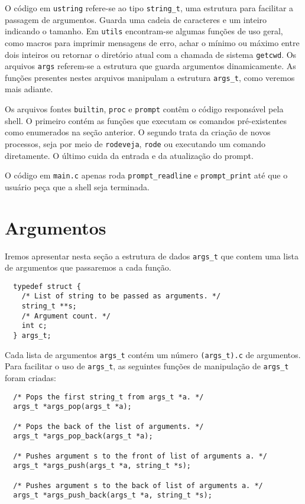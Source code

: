 \documentclass{amsart}
\theoremstyle{plain}
\newcommand{\code}[1]{\lstinline[mathescape=true]{#1}}
\begin{document}
O código em \code{ustring} refere-se ao tipo \code{string_t}, uma estrutura para facilitar a
passagem de argumentos. Guarda uma cadeia de caracteres e um inteiro indicando o tamanho. Em
\code{utils} encontram-se algumas funções de uso geral, como macros para imprimir mensagens de
erro, achar o mínimo ou máximo entre dois inteiros ou retornar o diretório atual com a chamada de
sistema \code{getcwd}. Os arquivos \code{args} referem-se a estrutura que guarda argumentos
dinamicamente. As funções presentes nestes arquivos manipulam a estrutura \code{args_t}, como
veremos mais adiante.

Os arquivos fontes \code{builtin}, \code{proc} e \code{prompt} contêm o código responsável pela
shell. O primeiro contém as funções que executam os comandos pré-existentes como enumerados na
seção anterior. O segundo trata da criação de novos processos, seja por meio de \code{rodeveja},
\code{rode} ou executando um comando diretamente. O último cuida da entrada e da atualização do
prompt.

O código em \code{main.c} apenas roda \code{prompt_readline} e \code{prompt_print} até que o
usuário peça que a shell seja terminada.

\section{Argumentos}

Iremos apresentar nesta seção a estrutura de dados \code{args_t} que contem uma lista de argumentos
que passaremos a cada função.

\begin{verbatim}
  typedef struct {
    /* List of string to be passed as arguments. */
    string_t **s;
    /* Argument count. */
    int c;
  } args_t;
\end{verbatim}

Cada lista de argumentos \code{args_t} contém um número \code{(args_t).c} de argumentos. Para
facilitar o uso de \code{args_t}, as seguintes funções de manipulação de \code{args_t} foram
criadas:

\begin{verbatim}
  /* Pops the first string_t from args_t *a. */
  args_t *args_pop(args_t *a);

  /* Pops the back of the list of arguments. */
  args_t *args_pop_back(args_t *a);

  /* Pushes argument s to the front of list of arguments a. */
  args_t *args_push(args_t *a, string_t *s);

  /* Pushes argument s to the back of list of arguments a. */
  args_t *args_push_back(args_t *a, string_t *s);
\end{verbatim}
\end{document}
